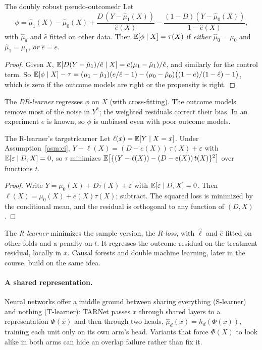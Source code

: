 \documentclass[11pt]{article}
\begin{document}
\begin{prop}{The doubly robust pseudo-outcome}{dr}
Let
\[
  \phi = \hat\mu_1(X) - \hat\mu_0(X) + \frac{D\,(Y - \hat\mu_1(X))}{\hat e(X)} - \frac{(1-D)(Y - \hat\mu_0(X))}{1 - \hat e(X)},
\]
with $\hat\mu_d$ and $\hat e$ fitted on other data. Then $\mathbb{E}[\phi \mid X] = \tau(X)$ if \emph{either} $\hat\mu_0 = \mu_0$
and $\hat\mu_1 = \mu_1$, \emph{or} $\hat e = e$.
\end{prop}
\begin{proof}
Given $X$, $\mathbb{E}[D(Y - \hat\mu_1)/\hat e \mid X] = e(\mu_1 - \hat\mu_1)/\hat e$, and similarly for the control term.
So $\mathbb{E}[\phi \mid X] - \tau = (\mu_1 - \hat\mu_1)(e/\hat e - 1) - (\mu_0 - \hat\mu_0)\big((1-e)/(1-\hat e) - 1\big)$,
which is zero if the outcome models are right or the propensity is right.
\end{proof}
The \emph{DR-learner} regresses $\phi$ on $X$ (with cross-fitting). The outcome models remove most of the noise in
$Y^\ast$; the weighted residuals correct their bias. In an experiment $e$ is known, so $\phi$ is unbiased even with
poor outcome models.

\begin{prop}{The R-learner's target}{rlearner}
Let $\ell(x) = \mathbb{E}[Y \mid X=x]$. Under Assumption~\ref{asm:ci}, $Y - \ell(X) = (D - e(X))\,\tau(X) + \varepsilon$ with
$\mathbb{E}[\varepsilon \mid D, X] = 0$, so $\tau$ minimizes $\mathbb{E}\big[\{(Y - \ell(X)) - (D - e(X))\,t(X)\}^2\big]$ over functions $t$.
\end{prop}
\begin{proof}
Write $Y = \mu_0(X) + D\tau(X) + \varepsilon$ with $\mathbb{E}[\varepsilon \mid D, X] = 0$. Then
$\ell(X) = \mu_0(X) + e(X)\tau(X)$; subtract. The squared loss is minimized by the conditional mean, and
the residual is orthogonal to any function of $(D, X)$.
\end{proof}
The \emph{R-learner} minimizes the sample version, the \emph{R-loss}, with $\hat\ell$ and $\hat e$ fitted on other
folds and a penalty on $t$. It regresses the outcome residual on the treatment residual, locally in $x$. Causal forests and double
machine learning, later in the course, build on the same idea.

\paragraph{A shared representation.} Neural networks offer a middle ground between sharing everything
(S-learner) and nothing (T-learner): TARNet passes $x$ through shared layers to a representation $\Phi(x)$ and
then through two heads, $\hat\mu_d(x) = h_d(\Phi(x))$, training each unit only on its own arm's head. Variants
that force $\Phi(X)$ to look alike in both arms can hide an overlap failure rather than fix it.
\end{document}

